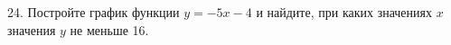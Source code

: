 24. Постройте график функции $y=-5x-4$ и найдите, при каких значениях $x$ значения $y$ не меньше 16.\\

